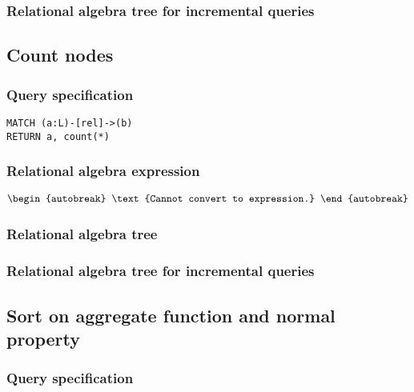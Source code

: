 \subsubsection*{Relational algebra tree for incremental queries}


\subsection{Count nodes}

\subsubsection*{Query specification}

\begin{lstlisting}
MATCH (a:L)-[rel]->(b)
RETURN a, count(*)
\end{lstlisting}

\subsubsection*{Relational algebra expression}

\begin{align*}
\begin{autobreak}
\text{Cannot convert to expression.}
\end{autobreak}
\end{align*}

\subsubsection*{Relational algebra tree}


\subsubsection*{Relational algebra tree for incremental queries}


\subsection{Sort on aggregate function and normal property}

\subsubsection*{Query specification}

